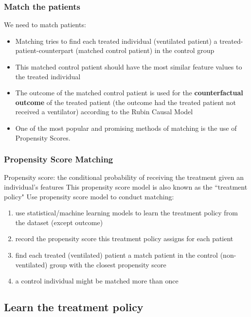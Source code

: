 \documentclass{beamer}
\begin{document}
\begin{frame}
\frametitle{Match the patients}
We need to match patients: 
\newline 
\begin{itemize}
\item Matching tries to find each treated individual (ventilated patient) a treated-patient-counterpart (matched control patient) in the control group
\item This matched control patient should have the most similar feature values to the treated individual
\pause
\item The outcome of the matched control patient is used for the \textbf{counterfactual outcome} of the treated patient (the outcome had the treated patient not received a ventilator) according to the Rubin Causal Model
\item One of the most popular and promising methods of matching is the use of Propensity Scores.
\end{itemize}  
\end{frame}
\begin{frame}
\frametitle{Propensity Score Matching}
Propensity score: the conditional probability of receiving the treatment given an individual's features
\newline 
\newline This propensity score model is also known as the ``treatment policy"
\pause
\newline 
\newline Use propensity score model to conduct matching:
\begin{enumerate}
\item use statistical/machine learning models to learn the treatment policy from the dataset (except outcome)
\item record the propensity score this treatment policy assigns for each patient
\item find each treated (ventilated) patient a match patient in the control (non-ventilated) group with the closest propensity score
\item a control individual might be matched more than once
\end{enumerate} 
\end{frame}
\subsection{Learn the treatment policy}
\end{document}
